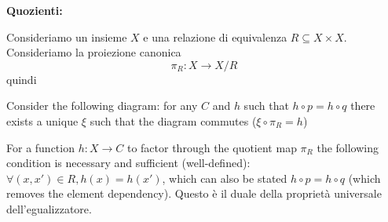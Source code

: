 \documentclass[a4paper]{article}
\begin{document}
\textbf{Quozienti:}

Consideriamo un insieme \(X\) e una relazione di equivalenza \(R \subseteq X \times X\).
Consideriamo la proiezione canonica
\[
    \pi_R \colon X \to X/R
\]
quindi
Consider the following diagram:
for any \(C\) and \(h\) such that \(h\circ p = h \circ q\)
there exists a unique \(\xi\)
such that the diagram commutes (\(\xi \circ \pi_R = h\))
For a function \(h \colon X \to C\) to factor through the quotient map
\(\pi_R\) the following condition is necessary and sufficient (well-defined):
\(\forall(x,x') \in R, h(x) = h(x')\), which can also be stated
\(h \circ p = h \circ q\) (which removes the element dependency).
Questo è il duale della proprietà universale dell'egualizzatore.
\end{document}
